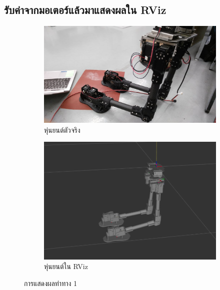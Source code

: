 \clearpage
\subsection{รับค่าจากมอเตอร์แล้วมาแสดงผลใน RViz}

\begin{figure}[!ht]
    \centering
    \begin{subfigure}[b]{0.45\textwidth}
        \centering
        \includegraphics[width=\textwidth]{chapter4/images/robot_2_rviz1.jpg}
        \caption{หุ่นยนต์ตัวจริง}
    \end{subfigure}
    \hfill
    \begin{subfigure}[b]{0.45\textwidth}
        \centering
        \includegraphics[width=\textwidth]{chapter4/images/robot_2_rviz1.png}
        \caption{หุ่นยนต์ใน RViz}
    \end{subfigure}
    \caption{การแสดงผลท่าทาง 1}
	\label{fig:robot_2_rviz1}
\end{figure}

